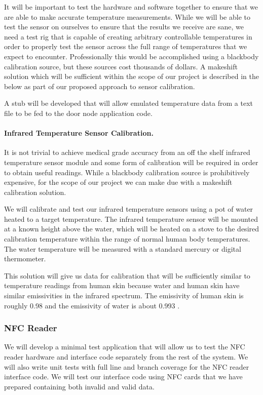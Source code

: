 It will be important to test the hardware and software together to ensure that
we are able to make accurate temperature measurements. While we will be able to
test the sensor on ourselves to ensure that the results we receive are sane, we
need a test rig that is capable of creating arbitrary controllable temperatures
in order to properly test the sensor across the full range of temperatures that
we expect to encounter. Professionally this would be accomplished using a
blackbody calibration source, but these sources cost thousands of dollars. A
makeshift solution which will be sufficient within the scope of our project is
described in the below as part of our proposed approach to sensor calibration.

A stub will be developed that will allow emulated temperature data from a text
file to be fed to the door node application code.

\paragraph{Infrared Temperature Sensor Calibration.}
It is not trivial to achieve medical grade accuracy from an off the shelf
infrared temperature sensor module and some form of calibration will be required
in order to obtain useful readings. While a blackbody calibration source is
prohibitively expensive, for the scope of our project we can make due with a
makeshift calibration solution.

We will calibrate and test our infrared temperature sensors using a pot of water
heated to a target temperature. The infrared temperature sensor will be mounted at a
known height above the water, which will be heated on a stove to the desired
calibration temperature within the range of normal human body temperatures.
The water temperature will be measured with a standard mercury or digital
thermometer.

This solution will give us data for calibration that will be sufficiently
similar to temperature readings from human skin because water and human skin
have similar emissivities in the infrared spectrum. The emissivity of human skin
is roughly 0.98 \cite{Steketee_1973} and the emissivity of water is about 0.993
\cite{Buettner_1965}.

\subsubsection{NFC Reader}

We will develop a minimal test application that will allow us to test the NFC
reader hardware and interface code separately from the rest of the system. We
will also write unit tests with full line and branch coverage for the NFC reader
interface code. We will test our interface code using NFC cards that we have
prepared containing both invalid and valid data.

